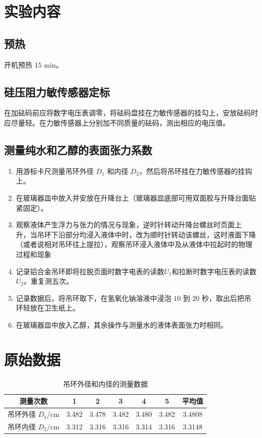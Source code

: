 \documentclass[UTF8]{ctexart}
\title{}
\author{}
\date{}
\begin{document}
	
\begin{titlepage}		
	
\end{titlepage}
	

\section{实验内容}
\subsection{预热} 
开机预热 $15$ min。
\subsection{硅压阻力敏传感器定标} 
在加砝码前应将数字电压表调零，将砝码盘挂在力敏传感器的挂勾上，安放砝码时应尽量轻。在力敏传感器上分别加不同质量的砝码，测出相应的电压值。
\subsection{测量纯水和乙醇的表面张力系数}
\begin{enumerate}
   \item 用游标卡尺测量吊环外径 $D_1$ 和内径 $D_2$，然后将吊环挂在力敏传感器的挂钩上。 
   \item 在玻璃器皿中放入并安放在升降台上（玻璃器皿底部可用双面胶与升降台面贴紧固定）。 
   \item 观察液体产生浮力与张力的情况与现象，逆时针转动升降台螺丝时页面上 升，当吊环下沿部分均浸入液体中时，改为顺时针转动该螺丝，这时液面下降（或者说相对吊环往上提拉），观察吊环浸入液体中及从液体中拉起时的物理过程和现象
   \item 记录铝合金吊环即将拉脱页面时数字电表的读数$U_1$和拉断时数字电压表的读数 $U_2$。重复测五次。 
   \item 记录数据后，将吊环取下，在氢氧化钠溶液中浸泡 $10$ 到 $20$ 秒，取出后把吊环轻放在卫生纸上。
   \item 在玻璃器皿中放入乙醇，其余操作与测量水的液体表面张力时相同。
\end{enumerate}

\section{原始数据}
\begin{table}[H]
\centering
\caption{吊环外径和内径的测量数据}
\begin{tabular}{|c|c|c|c|c|c|c|}
\hline
     测量次数 & 1 & 2 & 3 & 4 & 5 & 平均值 \\
\hline
     吊环外径 $D_1$/cm & 3.482 & 3.478 & 3.482 & 3.480 & 3.482  & 3.4808 \\ 
\hline
     吊环内径 $D_2$/cm & 3.312 & 3.316 & 3.316 & 3.314 & 3.316  & 3.3148 \\ 
\hline
\end{tabular}
\end{table}
\end{document}
